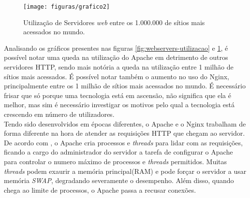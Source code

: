 \begin{figure}[htb]
	\centering
	\texttt{[image: figuras/grafico2]} 
	\caption{Utilização de Servidores \textit{web} entre os 1.000.000 de sítios 
	mais acessados no mundo.}
	\label{fig:webservers-utilizacao-milhao}
\end{figure}
Analisando os gráficos presentes nas figuras \ref{fig:webservers-utilizacao} e 
\ref{fig:webservers-utilizacao-milhao}, é possível notar uma queda na 
utilização do Apache em detrimento de outros servidores HTTP, sendo mais 
notória a queda na utilização entre 1 milhão de sítios mais acessados. É 
possível notar também o aumento no uso do Nginx, principalmente entre os 1 
milhão de sítios mais acessados no mundo. É necessário frisar que só porque uma 
tecnologia está em ascensão, não significa que ela é melhor, mas sim é 
necessário investigar os motivos pelo qual a tecnologia está crescendo em 
número de utilizadores.\\
Tendo sido desenvolvidos em épocas diferentes, o Apache e o Nginx trabalham de 
forma diferente na hora de atender as requisições HTTP que chegam ao servidor.\\
De acordo com , o Apache cria processos e \textit{threads} 
para lidar com as requisições, ficando a cargo do administrador do servidor a 
tarefa de configurar o Apache para controlar o numero máximo de processos e 
\textit{threads} permitidos. Muitas \textit{threads} podem exaurir a memória 
principal(RAM) e pode forçar o servidor a usar memória \textit{SWAP}, 
degradando severamente o desempenho. Além disso, quando chega ao limite de 
processos, o Apache passa a recusar conexões.
